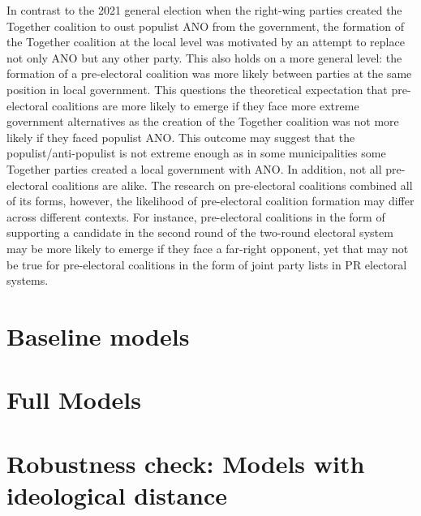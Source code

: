 \documentclass[fignum,12pt,titlepage]{article}
\begin{document}
In contrast to the 2021 general election when the right-wing parties created the Together coalition to oust populist ANO from the government, the formation of the Together coalition at the local level was motivated by an attempt to replace not only ANO but any other party. This also holds on a more general level: the formation of a pre-electoral coalition was more likely between parties at the same position in local government. This questions the theoretical expectation that pre-electoral coalitions are more likely to emerge if they face more extreme government alternatives as the creation of the Together coalition was not more likely if they faced populist ANO. This outcome may suggest that the populist/anti-populist is not extreme enough as in some municipalities some Together parties created a local government with ANO. In addition, not all pre-electoral coalitions are alike. The research on pre-electoral coalitions combined all of its forms, however, the likelihood of pre-electoral coalition formation may differ across different contexts. For instance, pre-electoral coalitions in the form of supporting a candidate in the second round of the two-round electoral system may be more likely to emerge if they face a far-right opponent, yet that may not be true for pre-electoral coalitions in the form of joint party lists in PR electoral systems. 



\printbibliography  

\newpage

\appendix

\section{Baseline models}
{}

\newpage

\section{Full Models}


\section{Robustness check: Models with ideological distance}
\label{app:1}
\end{document}
